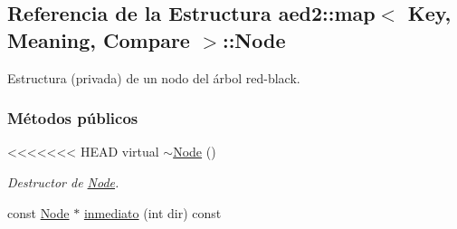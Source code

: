 \hypertarget{structaed2_1_1map_1_1Node}{}\subsection{Referencia de la Estructura aed2\+:\+:map$<$ Key, Meaning, Compare $>$\+:\+:Node}
\label{structaed2_1_1map_1_1Node}


Estructura (privada) de un nodo del árbol red-\/black.  


\subsubsection*{Métodos públicos}
\begin{DoxyCompactItemize}
\item 
<<<<<<< HEAD
virtual \hyperlink{structaed2_1_1map_1_1Node_a4f3cb2cc4302fe96432e624ced147540_a4f3cb2cc4302fe96432e624ced147540}{$\sim$\-Node} ()
\begin{DoxyCompactList}\small\item\em \-Destructor de \hyperlink{structaed2_1_1map_1_1Node}{\-Node}. \end{DoxyCompactList}\item 
const \hyperlink{structaed2_1_1map_1_1Node}{\-Node} $\ast$ \hyperlink{structaed2_1_1map_1_1Node_a4d5263c74ea5f78025fea331267730ce_a4d5263c74ea5f78025fea331267730ce}{inmediato} (int dir) const 
\end{DoxyCompactItemize}
